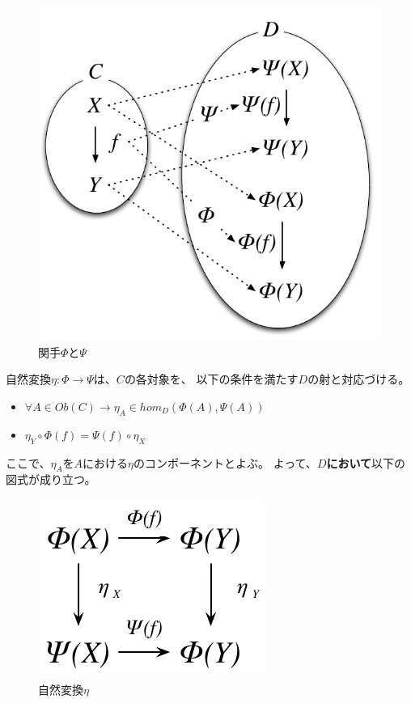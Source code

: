 \documentclass{jsarticle}
\begin{document}
\begin{figure}[htbp]
    \centering
    \includegraphics{diag_nt.pdf}
    \caption{関手$\Phi$と$\Psi$}
\end{figure}

自然変換$\eta:\Phi\to\Psi$は、$C$の各対象を、
以下の条件を満たす$D$の射と対応づける。
\begin{itemize}
    \item $\forall A\in Ob(C)\to \eta_A\in hom_D(\Phi(A),\Psi(A))$
    \item $\eta_Y\circ \Phi(f)=\Psi(f)\circ\eta_X$
\end{itemize}
ここで、$\eta_A$を$A$における$\eta$のコンポーネントとよぶ。
よって、\textbf{$D$において}以下の図式が成り立つ。

\begin{figure}[htbp]
    \centering
    \includegraphics{diag_nt2.pdf}
    \caption{自然変換$\eta$}
\end{figure}
\end{document}
